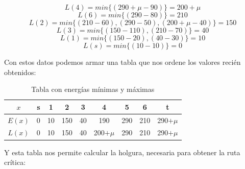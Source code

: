 \documentclass[letterpaper,10pt]{article}
\begin{document}
\begin{enumerate}
\begin{minipage}[t]{0.498\textwidth}
\begin{equation*}
            \end{equation*}
            \begin{equation*}
                L(4) = min\{(290+\mu - 90)\} = 200 + \mu
            \end{equation*}
            \begin{equation*}
                L(6) = min\{(290-80)\} = 210
            \end{equation*}
            \begin{equation*}
                L(2) = min\{(210-60),(290-50),(200+\mu-40)\} = 150
            \end{equation*}
            \begin{equation*}
                L(3) = min\{(150-110),(210-70)\} = 40
            \end{equation*}
            \begin{equation*}
                L(1) = min\{(150-20),(40-30)\} = 10
            \end{equation*}
            \begin{equation*}
                L(s) = min\{(10-10)\} = 0
            \end{equation*}
        \end{minipage}
        \newline
        \newline
        \newline
        Con estos datos podemos armar una tabla que nos ordene los valores recién obtenidos:

        \begin{table}[H]
            \centering
        \begin{tabular}{|c|c|c|c|c|c|c|c|c|}\hline
            $ x  $ & s & 1 & 2 & 3 & 4 & 5 & 6 & t \\ \hline
             $E(x)$ & 0 & 10 & 150 & 40 & 190 & 290 & 210 & 290$+\mu$    \\\hline
             $L(x)$ & 0 & 10 & 150 & 40 & 200$+\mu$ & 290 & 210 & 290$+\mu$ \\\hline
            \end{tabular}
            \caption{Tabla con energías mínimas y máximas}
            \label{tablita23}
        \end{table}

        \newpage
        Y esta tabla nos permite calcular la holgura, necesaria para obtener la ruta crítica:


\end{enumerate}
\end{document}
